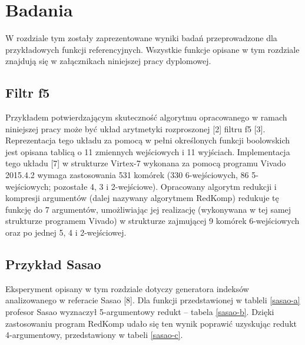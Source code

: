 \chapter{Badania}
\label{chapter:research}

W rozdziale tym zostały zaprezentowane wyniki badań przeprowadzone dla przykładowych funkcji referencyjnych.
Wszystkie funkcje opisane w tym rozdziale znajdują się w załącznikach niniejszej pracy dyplomowej.

\section{Filtr f5}

Przykładem potwierdzającym skuteczność algorytmu opracowanego w ramach niniejszej pracy
może być układ arytmetyki rozproszonej [2] filtru f5 [3].
Reprezentacja tego układu za pomocą w pełni określonych funkcji boolowskich
jest opisana tablicą o 11 zmiennych wejściowych i 11 wyjściach.
Implementacja tego układu [7] w strukturze Virtex-7 wykonana za pomocą programu Vivado 2015.4.2
wymaga zastosowania 531 komórek (330 6-wejściowych, 86 5-wejściowych; pozostałe 4, 3 i 2-wejściowe).
Opracowany algorytm redukcji i kompresji argumentów (dalej nazywany algorytmem RedKomp)
redukuje tę funkcję do 7 argumentów,
umożliwiając jej realizację
(wykonywana w tej samej strukturze programem Vivado)
w strukturze zajmującej 9 komórek 6-wejściowych oraz po jednej 5, 4 i 2-wejściowej.

\section{Przykład Sasao}

Eksperyment opisany w tym rozdziale dotyczy generatora indeksów analizowanego w referacie Sasao [8].
Dla funkcji przedstawionej w tableli \ref{sasao-a} profesor Sasao wyznaczył 5-argumentowy redukt – tabela \ref{sasao-b}.
Dzięki zastosowaniu program RedKomp udało się ten wynik poprawić uzyskując redukt 4-argumentowy,
przedstawiony w tabeli \ref{sasao-c}.

